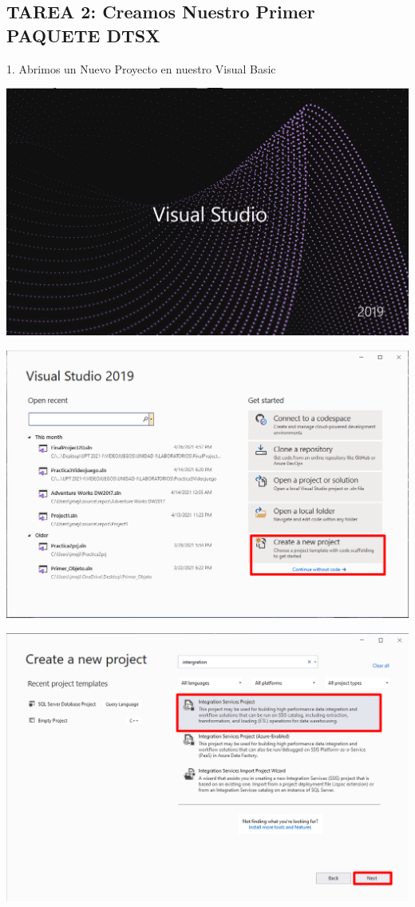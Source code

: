 \documentclass[12pt,letterpaper]{article}
\begin{document}
\subsection{TAREA 2: Creamos Nuestro Primer PAQUETE DTSX}
1.  Abrimos un Nuevo Proyecto en nuestro Visual Basic
	\begin{center}
	\includegraphics[width=14cm]{./img/12}
	\vspace{2cm}
	\end{center}
	\begin{center}
		\includegraphics[width=16cm]{./img/13}
	\end{center}
	\begin{center}
		\includegraphics[width=14cm]{./img/14}
	\end{center}	
\end{document}
